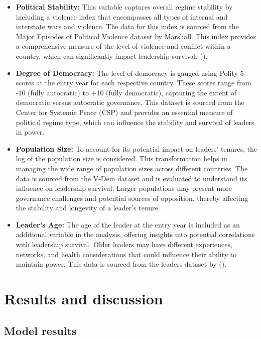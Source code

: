 \documentclass[
  12pt,
]{report}
\begin{document}
\begin{itemize}
\item
  \textbf{Political Stability:} This variable captures overall regime
  stability by including a violence index that encompasses all types of
  internal and interstate wars and violence. The data for this index is
  sourced from the Major Episodes of Political Violence dataset by
  Marshall. This index provides a comprehensive measure of the level of
  violence and conflict within a country, which can significantly impact
  leadership survival. ().
\item
  \textbf{Degree of Democracy:} The level of democracy is gauged using
  Polity 5 scores at the entry year for each respective country. These
  scores range from -10 (fully autocratic) to +10 (fully democratic),
  capturing the extent of democratic versus autocratic governance. This
  dataset is sourced from the Center for Systemic Peace (CSP) and
  provides an essential measure of political regime type, which can
  influence the stability and survival of leaders in power.
\item
  \textbf{Population Size:} To account for its potential impact on
  leaders' tenures, the log of the population size is considered. This
  transformation helps in managing the wide range of population sizes
  across different countries. The data is sourced from the V-Dem dataset
  and is evaluated to understand its influence on leadership survival.
  Larger populations may present more governance challenges and
  potential sources of opposition, thereby affecting the stability and
  longevity of a leader's tenure.
\item
  \textbf{Leader's Age:} The age of the leader at the entry year is
  included as an additional variable in the analysis, offering insights
  into potential correlations with leadership survival. Older leaders
  may have different experiences, networks, and health considerations
  that could influence their ability to maintain power. This data is
  sourced from the leaders dataset by
  ().
\end{itemize}

\section{Results and discussion}\label{results-and-discussion-1}

\subsection{Model results}\label{model-results}
\end{document}
